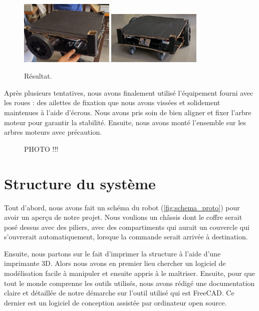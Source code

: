\documentclass[a4paper,12pt]{report}  %
\begin{document}
\begin{figure}[H]
	\centering
	\includegraphics[width=0.4\textwidth]{./attachments/proto-photo-1.png}
	\includegraphics[width=0.4\textwidth]{./attachments/proto-photo-2.png}
	\caption{Résultat.}
\end{figure}

Après plusieurs tentatives, nous avons finalement utilisé l’équipement fourni avec les roues : des ailettes de fixation que nous avons vissées et solidement maintenues à l’aide d’écrous. Nous avons pris soin de bien aligner et fixer l’arbre moteur pour garantir la stabilité. Ensuite, nous avons monté l’ensemble sur les arbres moteurs avec précaution.


\begin{figure}[H]
	\centering
	\caption{PHOTO !!!}
\end{figure}


\section{Structure du système}

Tout d’abord, nous avons fait un schéma du robot (\autoref{fig:schema_proto}) pour avoir un aperçu de notre projet. Nous voulions un châssis dont le coffre serait posé dessus avec des piliers, avec des compartiments qui aurait un couvercle qui s'ouvrerait automatiquement, lorsque la commande serait arrivée à destination. 

Ensuite, nous partons sur le fait d’imprimer la structure à l’aide d’une imprimante 3D. Alors nous avons en premier lieu chercher un logiciel de modélisation facile à manipuler et ensuite appris à le maîtriser. Ensuite, pour que tout le monde comprenne les outils utilisés, nous avons rédigé une documentation claire et détaillée de notre démarche sur l'outil utilisé qui est FreeCAD. Ce dernier est un logiciel de conception assistée par ordinateur open source.
\end{document}
